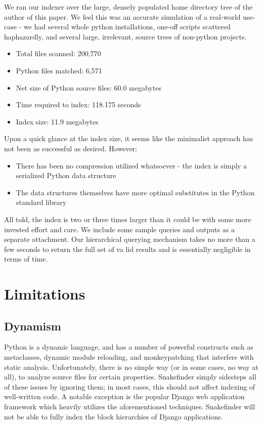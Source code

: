 \documentclass{article}
\begin{document}
We ran our indexer over the large, densely populated home directory tree of the author of this paper. We feel this was an accurate simulation of a real-world use-case - we had several whole python installations, one-off scripts scattered haphazardly, and several large, irrelevant, source trees of non-python projects.

\begin{itemize}
	\item Total files scanned: 200,770
	\item Python files matched: 6,571
	\item Net size of Python source files: 60.0 megabytes
	\item Time required to index: 118.175 seconds
	\item Index size: 11.9 megabytes
	\end{itemize}

Upon a quick glance at the index size, it seems like the minimalist approach has not been as successful as desired. However:
	\begin{itemize}
	\item There has been no compression utilized whatsoever - the index is simply a serialized Python data structure
	\item The data structures themselves have more optimal substitutes in the Python standard library
	\end{itemize}
	All told, the index is two or three times larger than it could be with some more invested effort and care.
	We include some sample queries and outputs as a separate attachment. Our hierarchical querying mechanism takes no more than a few seconds
	to return the full set of va	lid results and is essentially negligible in terms of time.

\section{Limitations}
\subsection{Dynamism}
Python is a dynamic language, and has a number of powerful constructs such as metaclasses, dynamic module reloading, and monkeypatching that interfere with static analysis. Unfortunately, there is no simple way (or in some cases, no way at all), to analyze source files for certain properties. Snakefinder simply sidesteps all of these issues by ignoring them; in most cases, this should not affect indexing of well-written code.
A notable exception is the popular Django web application framework which heavily utilizes the aforementioned techniques. Snakefinder will not be able to fully index the block hierarchies of Django applications.
\end{document}

